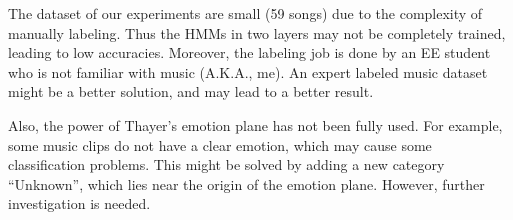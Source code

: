 \documentclass{IEEEtran}
\begin{document}
  The dataset of our experiments are small (59 songs) due to the complexity
  of manually labeling. Thus the HMMs in two layers may not be completely
  trained, leading to low accuracies. Moreover, the labeling job is done
  by an EE student who is not familiar with music (A.K.A., me). An expert
  labeled music dataset might be a better solution, and may lead to a better
  result.

  Also, the power of Thayer's emotion plane has not been fully used. For
  example, some music clips do not have a clear emotion, which may cause some
  classification problems. This might be solved by adding a new category ``Unknown'', which lies near the origin of the emotion plane. However, further
  investigation is needed.

  
  
\end{document}
